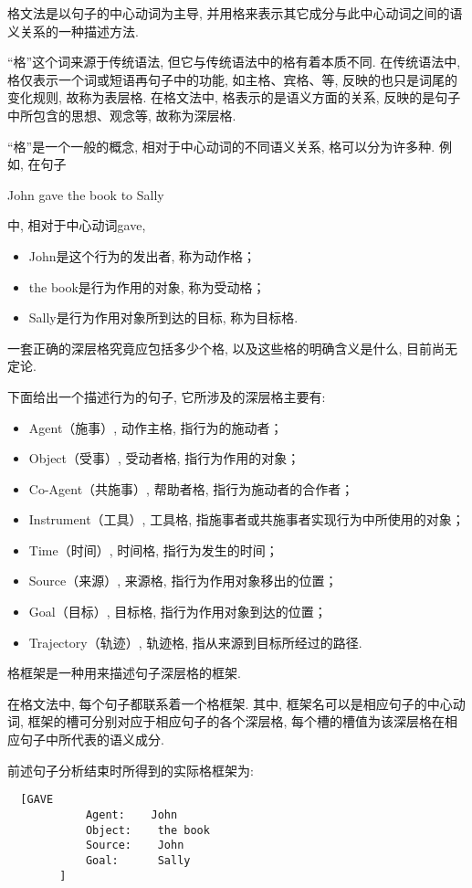     格文法是以句子的中心动词为主导, 并用格来表示其它成分与此中心动词之间的语义关系的一种描述方法.

“格”这个词来源于传统语法, 但它与传统语法中的格有着本质不同. 在传统语法中, 格仅表示一个词或短语再句子中的功能, 如主格、宾格、等, 反映的也只是词尾的变化规则, 故称为表层格. 在格文法中, 格表示的是语义方面的关系, 反映的是句子中所包含的思想、观念等, 故称为深层格.

“格”是一个一般的概念, 相对于中心动词的不同语义关系, 格可以分为许多种. 例如, 在句子
\begin{center}
    John gave the book to Sally
\end{center}
中, 相对于中心动词gave,

\begin{itemize}
\item John是这个行为的发出者, 称为动作格；
\item the book是行为作用的对象, 称为受动格；
\item Sally是行为作用对象所到达的目标, 称为目标格.
\end{itemize}

 一套正确的深层格究竟应包括多少个格, 以及这些格的明确含义是什么, 目前尚无定论.

下面给出一个描述行为的句子, 它所涉及的深层格主要有:
\begin{itemize}
\item Agent（施事）,  动作主格, 指行为的施动者；
\item Object（受事）, 受动者格, 指行为作用的对象；
\item Co-Agent（共施事）, 帮助者格, 指行为施动者的合作者；
\item Instrument（工具）, 工具格, 指施事者或共施事者实现行为中所使用的对象；
\item Time（时间）,   时间格, 指行为发生的时间；
\item Source（来源）, 来源格, 指行为作用对象移出的位置；
\item Goal（目标）,   目标格, 指行为作用对象到达的位置；
\item Trajectory（轨迹）, 轨迹格, 指从来源到目标所经过的路径.
\end{itemize}

格框架是一种用来描述句子深层格的框架.


在格文法中, 每个句子都联系着一个格框架. 其中, 框架名可以是相应句子的中心动词, 框架的槽可分别对应于相应句子的各个深层格, 每个槽的槽值为该深层格在相应句子中所代表的语义成分.

\begin{example}
前述句子分析结束时所得到的实际格框架为:
\begin{Verbatim}
  [GAVE
            Agent:    John
            Object:    the book
            Source:    John
            Goal:      Sally
        ]
\end{Verbatim}
\end{example}
